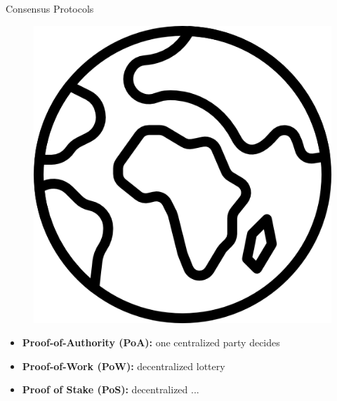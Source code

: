 \documentclass[]{beamer}
\begin{document}
\begin{frame}{Consensus Protocols}

\begin{figure}
	\includegraphics[height = 0.3\textheight]{../assets/images/globe.png}	
\end{figure}

\vspace{1.5em}

\begin{itemize}
	\item<2-> \textbf{Proof-of-Authority (PoA):} one centralized party decides
	\item<3-> \textbf{Proof-of-Work (PoW):} decentralized lottery
	\item<4-> \textbf{Proof of Stake (PoS):} decentralized ...

\end{itemize}

\end{frame}
\end{document}
